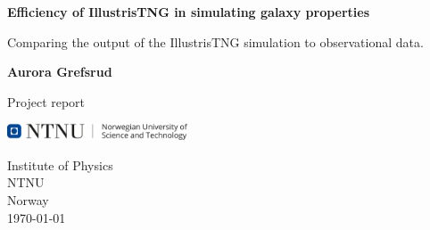 \begin{titlepage}
   \begin{center}
       \vspace*{1cm}

       \textbf{Efficiency of IllustrisTNG in simulating galaxy properties}

       \vspace{0.5cm}
        Comparing the output of the IllustrisTNG simulation to observational data.
            
       \vspace{1.5cm}

       \textbf{Aurora Grefsrud}

       \vfill
            
       Project report\\
            
       \vspace{0.8cm}
     
       \includegraphics[width=0.4\textwidth]{images/ntnu.png}
            
       Institute of Physics\\
       NTNU\\
       Norway\\
       \today
            
   \end{center}
\end{titlepage}